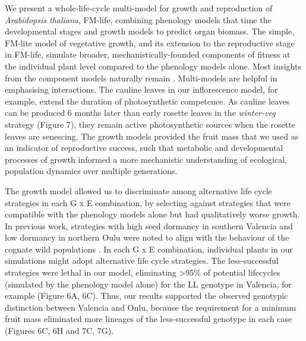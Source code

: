 \documentclass[phd]{infthesis}
\begin{document}
We present a whole-life-cycle multi-model for growth and reproduction of
\emph{Arabidopsis thaliana}, FM-life, combining phenology models that time the
developmental stages and growth models to predict organ biomass. The simple,
FM-lite model of vegetative growth, and its extension to the reproductive stage
in FM-life, simulate broader, mechanistically-founded components of fitness at
the individual plant level compared to the phenology models alone. Most insights
from the component models naturally remain
\citep{rasse_leaf_2006,christophe_model-based_2008,
  wilczek_effects_2009,burghardt_modeling_2015}. Multi-models are helpful in
emphasising interactions. The cauline leaves in our inflorescence model, for
example, extend the duration of photosynthetic competence. As cauline leaves can
be produced 6 months later than early rosette leaves in the \emph{winter-veg}
strategy (Figure 7), they remain active photosynthetic sources
\citep{earley_inflorescences_2009, leonardos_photosynthetic_2014} when the
rosette leaves are senescing. The growth models provided the fruit mass that we
used as an indicator of reproductive success, such that metabolic and
developmental processes of growth informed a more mechanistic understanding of
ecological, population dynamics over multiple generations.

The growth model allowed us to discriminate among alternative life cycle
strategies in each G x E combination, by selecting against strategies that were
compatible with the phenology models alone but had qualitatively worse
growth. In previous work, strategies with high seed dormancy in southern
Valencia and low dormancy in northern Oulu were noted to align with the
behaviour of the cognate wild populations \citep{atwell_genome-wide_2010,
  chiang_dog1_2011, mendez-vigo_altitudinal_2011, burghardt_data_2014}. In each
G x E combination, individual plants in our simulations might adopt alternative
life cycle strategies. The less-successful strategies were lethal in our model,
eliminating \textgreater{}95\% of potential lifecycles (simulated by the
phenology model alone) for the LL genotype in Valencia, for example (Figure 6A,
6C). Thus, our results supported the observed genotypic distinction between
Valencia and Oulu, because the requirement for a minimum fruit mass eliminated
more lineages of the less-successful genotype in each case (Figures 6C, 6H and
7C, 7G).
\end{document}

